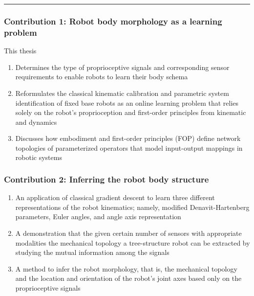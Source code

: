 \documentclass[12pt, a4paper]{article}
\begin{document}
\hrule

\subsubsection*{Contribution 1: Robot body morphology as a learning problem}
This thesis
\begin{enumerate}
	\item Determines the type of proprioceptive signals and corresponding sensor requirements to enable robots to learn their body schema	
	\item Reformulates the classical kinematic calibration and parametric system identification of fixed base robots as an online learning problem that relies solely on the robot's proprioception and first-order principles from kinematic and dynamics 
	\item Discusses how embodiment and first-order principles (FOP) define network topologies of parameterized operators that model input-output mappings in robotic systems
\end{enumerate}

\subsubsection*{Contribution 2: Inferring the robot body structure}
\begin{enumerate}
	\item An application of classical gradient descent to learn three different representations of the robot kinematics; namely, modified Denavit-Hartenberg parameters, Euler angles, and angle axis representation
	\item A demonstration that the given certain number of sensors with appropriate modalities the mechanical topology a tree-structure robot can be extracted by studying the mutual information among the signals
	\item A method to infer the robot morphology, that is, the mechanical topology and the location and orientation of the robot's joint axes based only on the proprioceptive signals

\end{enumerate}
\end{document}
